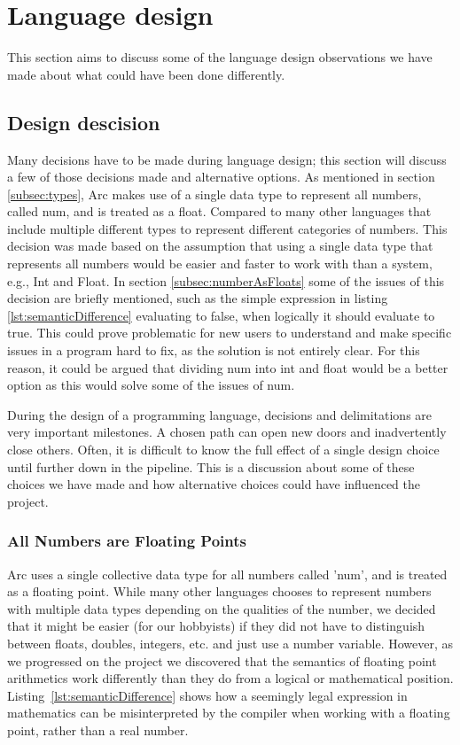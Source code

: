 \section{Language design}\label{sec:discussion_languageDesign}

This section aims to discuss some of the language design observations we have made about what could have been done differently.


\subsection{Design descision} 
Many decisions have to be made during language design; this section will discuss a few of those decisions made and alternative options.
As mentioned in section \ref{subsec:types}, Arc makes use of a single data type to represent all numbers, called num, and is treated as a float. Compared to many other languages that include multiple different types to represent different categories of numbers. This decision was made based on the assumption that using a single data type that represents all numbers would be easier and faster to work with than a system, e.g., Int and Float. In section \ref{subsec:numberAsFloats} some of the issues of this decision are briefly mentioned, such as the simple expression in listing \ref{lst:semanticDifference} evaluating to false, when logically it should evaluate to true. This could prove problematic for new users to understand and make specific issues in a program hard to fix, as the solution is not entirely clear. For this reason, it could be argued that dividing num into int and float would be a better option as this would solve some of the issues of num.


During the design of a programming language, decisions and delimitations are very important milestones. A chosen path can open new doors and inadvertently close others. Often, it is difficult to know the full effect of a single design choice until further down in the pipeline. This is a discussion about some of these choices we have made and how alternative choices could have influenced the project.

\subsubsection{All Numbers are Floating Points}

Arc uses a single collective data type for all numbers called 'num', and is treated as a floating point. While many other languages chooses to represent numbers with multiple data types depending on the qualities of the number, we decided that it might be easier (for our hobbyists) if they did not have to distinguish between floats, doubles, integers, etc. and just use a number variable. However, as we progressed on the project we discovered that the semantics of floating point arithmetics work differently than they do from a logical or mathematical position. Listing~\ref{lst:semanticDifference} shows how a seemingly legal expression in mathematics can be misinterpreted by the compiler when working with a floating point, rather than a real number.

